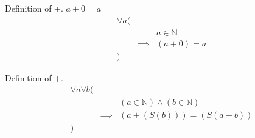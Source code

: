 \begin{defn}
\label{Definition:addition_0}
Definition of +. $a + 0 = a$
\begin{align*}
& \forall a ( \\
& & & a \in \mathbb{N} \\
& & \implies & (a + 0) = a \\
& )
\end{align*}
\end{defn}

\begin{defn}
\label{Definition:addition_s}
Definition of +.
\begin{align*}
& \forall a \forall b ( \\
& & & (a \in \mathbb{N}) \land (b \in \mathbb{N}) \\
& & \implies & (a + (S(b))) = (S(a + b)) \\
& )
\end{align*}
\end{defn}

